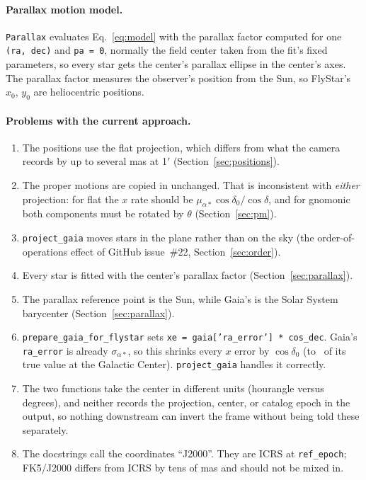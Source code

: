 \documentclass[11pt]{article}
\newcommand{\code}[1]{\texttt{#1}}
\begin{document}
\paragraph{Parallax motion model.} \code{Parallax} evaluates
Eq.~\eqref{eq:model} with the parallax factor computed for one
\code{(ra, dec)} and \code{pa = 0}, normally the field center taken from the
fit's fixed parameters, so every star gets the center's parallax ellipse in the
center's axes. The parallax factor measures the observer's position from the
Sun, so FlyStar's $x_0$, $y_0$ are heliocentric positions.

\paragraph{Problems with the current approach.}
\begin{enumerate}
  \item The positions use the flat projection, which differs from what the
    camera records by up to several mas at 1$'$ (Section~\ref{sec:positions}).
  \item The proper motions are copied in unchanged. That is inconsistent with
    \emph{either} projection: for flat the $x$ rate should be
    $\mu_{\alpha*}\cos\delta_0/\cos\delta$, and for gnomonic both components
    must be rotated by $\theta$ (Section~\ref{sec:pm}).
  \item \code{project\_gaia} moves stars in the plane rather than on the sky
    (the order-of-operations effect of GitHub issue~\#22, Section~\ref{sec:order}).
  \item Every star is fitted with the center's parallax factor
    (Section~\ref{sec:parallax}).
  \item The parallax reference point is the Sun, while Gaia's is the Solar
    System barycenter (Section~\ref{sec:parallax}).
  \item \code{prepare\_gaia\_for\_flystar} sets \code{xe = gaia['ra\_error'] * cos\_dec}.
    Gaia's \code{ra\_error} is already $\sigma_{\alpha*}$, so this shrinks every
    $x$ error by $\cos\delta_0$ (to \CosDecGC\ of its true value at the
    Galactic Center). \code{project\_gaia} handles it correctly.
  \item The two functions take the center in different units (hourangle versus
    degrees), and neither records the projection, center, or catalog epoch in
    the output, so nothing downstream can invert the frame without being told
    these separately.
  \item The docstrings call the coordinates ``J2000''. They are ICRS at
    \code{ref\_epoch}; FK5/J2000 differs from ICRS by tens of mas and should
    not be mixed in.
\end{enumerate}
\end{document}
